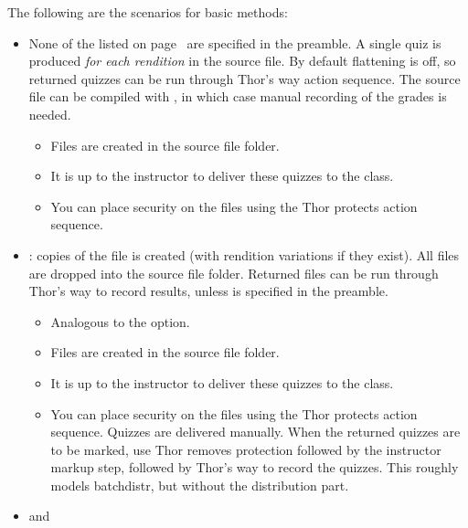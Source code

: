 \documentclass{article}
\begin{document}
\newtopic\noindent
The following are the scenarios for basic methods:
\begin{itemize}
  \item None of the \textbf{} listed on
      page~\pageref{para:OCs} are specified in the preamble. A single quiz
      is produced \emph{for each rendition} in the source file. By default flattening is off, so
      returned quizzes can be run through \textsf{Thor's way} action
      sequence. The source file can be compiled with , in
      which case manual recording of the grades is needed.
      \begin{itemize}
      \item Files are created in the source file folder.
      \item It is up to the instructor to deliver these quizzes to the
          class.
      \item You can place security on the files using the \textsf{Thor protects} action sequence.
      \end{itemize}
  \item {}:  copies of the file
      is created (with rendition variations if they exist). All files are
      dropped into the source file folder. Returned files can be run
      through \textsf{Thor's way} to record results, unless 
      is specified in the preamble.
      \begin{itemize}
      \item Analogous to the  option.
      \item Files are created in the source file folder.
      \item It is up to the instructor to deliver these quizzes to the
          class.
      \item You can place security on the files using the \textsf{Thor
          protects} action sequence. Quizzes are delivered manually. When
          the returned quizzes are to be marked, use \textsf{Thor removes
          protection} followed by the instructor markup step, followed by
          \textsf{Thor's way} to record the quizzes. This roughly models
          \textsf{batchdistr}, but without the distribution part.
      \end{itemize}
  \item {} and

\end{itemize}
\end{document}
